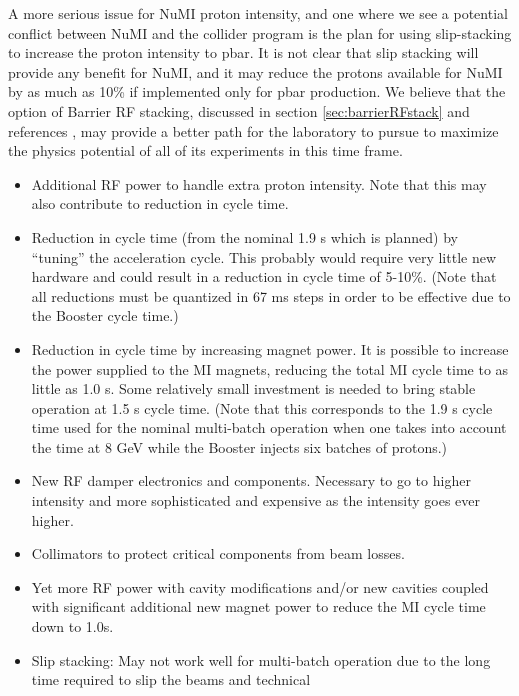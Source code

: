 \documentclass{article}
\begin{document}
A more serious issue for NuMI proton intensity, and one where we see a 
potential conflict between NuMI and the collider program is the plan for using
slip-stacking to increase the
proton intensity to pbar. It is not clear that slip stacking will provide
any benefit for NuMI, and it may reduce the protons available for NuMI
by as much as 10\% if implemented only for pbar production.
We believe that the option of Barrier RF stacking, discussed
in section \ref {sec:barrierRFstack} and references \cite {Griffin,Ng}, 
may provide a better
path for the laboratory to pursue to maximize the physics
potential of all of its experiments in this time frame.

   \begin {itemize}
   \item Additional RF power to handle extra proton intensity. Note that
         this may also contribute to reduction in cycle time. 
   \item Reduction in cycle time (from the nominal 1.9 s which is planned) 
         by ``tuning'' the acceleration cycle. This
         probably would require very little new hardware and could result in
         a reduction in cycle time of 5-10\%. (Note that all reductions
         must be quantized in 67 ms steps in order to be effective due
         to the Booster cycle time.)
   \item Reduction in cycle time by increasing magnet power.
         It is possible to increase the power supplied to the MI magnets,
         reducing the total MI cycle time to as little as 1.0 s. Some
         relatively small investment is needed to bring stable operation
         at 1.5 s cycle time. (Note that this corresponds to the 1.9 s cycle
         time used for the nominal multi-batch operation when one takes into
         account the time at 8 GeV while the Booster injects six batches of
         protons.)
   \item New RF damper electronics and components. Necessary to go to higher
         intensity and more sophisticated and expensive as the intensity goes
         ever higher.
   \item Collimators to protect critical components from beam losses.
   \item Yet more RF power with cavity modifications and/or new cavities 
         coupled with significant additional new magnet power 
         to reduce the MI cycle time down to 1.0s.
   \item Slip stacking: May not work well for multi-batch operation
         due to the long time required to slip the beams and technical 

\end{itemize}
\end{document}
